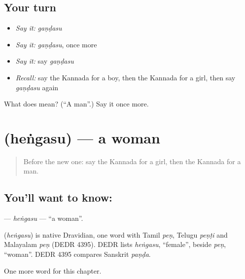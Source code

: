 \subsection*{Your turn}
\begin{itemize}
\raggedright
  \item \emph{Say it:} \emph{gaṇḍasu}
  \item \emph{Say it:} \emph{gaṇḍasu}, once more
  \item \emph{Say it:} say \emph{gaṇḍasu}
  \item \emph{Recall:} say the Kannada for a boy, then the Kannada for a girl, then say \emph{gaṇḍasu} again
\end{itemize}

\begin{tcolorbox}[breakable,colback=teal!4,colframe=teal!35!black,title={Before you move on}]
What does  mean? (\textquotedblleft{}A man\textquotedblright{}.) Say it once more.
\end{tcolorbox}
\section[\texorpdfstring{\kn{ಹೆಂಗಸು} (heṅgasu)}{ಹೆಂಗಸು (heṅgasu)}]{ (heṅgasu) — a woman}

\label{lesson:KA-C263-hengasu}



\begin{quote}
Before the new one: say the Kannada for a girl, then the Kannada for a man.
\end{quote}

\subsection*{You'll want to know: }
\textbf{} — \emph{heṅgasu} — \textquotedblleft{}a woman\textquotedblright{}.

\begin{cousinweb}
\textbf{} (\emph{heṅgasu}) is native Dravidian, one word with Tamil \emph{peṇ}, Telugu \emph{peṇṭi} and Malayalam \emph{peṇ} (DEDR 4395). DEDR lists \emph{heṅgasu}, \textquotedblleft{}female\textquotedblright{}, beside \emph{peṇ}, \textquotedblleft{}woman\textquotedblright{}. DEDR 4395 compares Sanskrit \emph{paṇḍa}.
\end{cousinweb}

\begin{grammarlens}[title={What you've built}]
One more word for this chapter.
\end{grammarlens}

